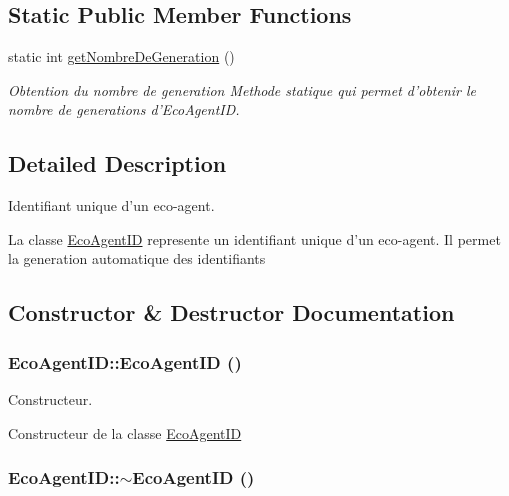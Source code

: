 \subsection*{Static Public Member Functions}
\begin{CompactItemize}
\item 
\hypertarget{classEcoAgentID_9b8f29915bff7e36bf53e695c148517e}{
static int \hyperlink{classEcoAgentID_9b8f29915bff7e36bf53e695c148517e}{getNombreDeGeneration} ()}
\label{classEcoAgentID_9b8f29915bff7e36bf53e695c148517e}

\begin{CompactList}\small\item\em Obtention du nombre de generation Methode statique qui permet d'obtenir le nombre de generations d'EcoAgentID. \item\end{CompactList}\end{CompactItemize}


\subsection{Detailed Description}
Identifiant unique d'un eco-agent. 

La classe \hyperlink{classEcoAgentID}{EcoAgentID} represente un identifiant unique d'un eco-agent. Il permet la generation automatique des identifiants 

\subsection{Constructor \& Destructor Documentation}
\hypertarget{classEcoAgentID_9c337e2ad56912db99193c03d1f82c56}{
\subsubsection[{EcoAgentID}]{\setlength{\rightskip}{0pt plus 5cm}EcoAgentID::EcoAgentID ()}}
\label{classEcoAgentID_9c337e2ad56912db99193c03d1f82c56}


Constructeur. 

Constructeur de la classe \hyperlink{classEcoAgentID}{EcoAgentID} \hypertarget{classEcoAgentID_97da1c0ae8891bbf10feb0574ef64a26}{
\subsubsection[{$\sim$EcoAgentID}]{\setlength{\rightskip}{0pt plus 5cm}EcoAgentID::$\sim$EcoAgentID ()}}
\label{classEcoAgentID_97da1c0ae8891bbf10feb0574ef64a26}



